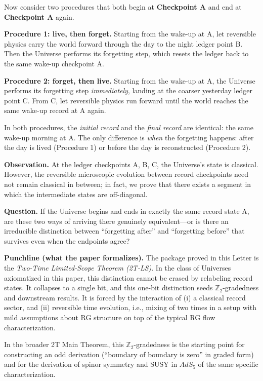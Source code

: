 \documentclass[aps,prl,reprint,floatfix]{revtex4-2}
\theoremstyle{plain}
\theoremstyle{definition}
\begin{document}
\smallskip
Now consider two procedures that both begin at \textbf{Checkpoint A} and end at
\textbf{Checkpoint A} again.

\smallskip
\noindent\textbf{Procedure 1: live, then forget.}
Starting from the wake-up at A, let reversible physics carry the world forward through
the day to the night ledger point B. Then the Universe performs its forgetting step, which resets
the ledger back to the same wake-up checkpoint A.

\smallskip
\noindent\textbf{Procedure 2: forget, then live.}
Starting from the wake-up at A, the Universe performs its forgetting step \emph{immediately},
landing at the coarser yesterday ledger point C. From C, let reversible physics run forward until
the world reaches the same wake-up record at A again.

\smallskip
In both procedures, the \emph{initial record} and the \emph{final record} are identical:
the same wake-up morning at A. The only difference is \emph{when} the forgetting happens:
after the day is lived (Procedure 1) or before the day is reconstructed (Procedure 2).

\smallskip
\noindent\textbf{Observation.}
At the ledger checkpoints A, B, C, the Universe's state is classical. However, the reversible microscopic evolution between record checkpoints need not remain classical in between; in fact, we prove that there exists a segment in which the intermediate states are off-diagonal. 

\smallskip
\noindent\textbf{Question.}
If the Universe begins and ends in exactly the same record state A, are these two ways of arriving there genuinely equivalent---or is there an irreducible distinction between ``forgetting after'' and ``forgetting before'' that survives even when the endpoints agree?

\smallskip
\noindent\textbf{Punchline (what the paper formalizes).}
The package proved in this Letter is the \emph{Two-Time Limited-Scope Theorem (2T-LS)}. In the class of Universes axiomatized in this paper, this distinction cannot be erased by relabeling record states. It collapses to a single bit, and this one-bit distinction seeds $\mathbb Z_2$-gradedness and downstream results.
It is forced by the interaction of (i) a classical record sector, and (ii) reversible time evolution, i.e., mixing of two times in a setup with mild assumptions about RG structure on top of the typical RG flow characterization. 


In the broader 2T Main Theorem, this $\mathbb Z_2$-gradedness is the starting point for constructing an odd derivation (“boundary of boundary is zero” in graded form) and for the derivation of spinor symmetry and SUSY in $AdS_5$ of the same specific characterization.
\end{document}
